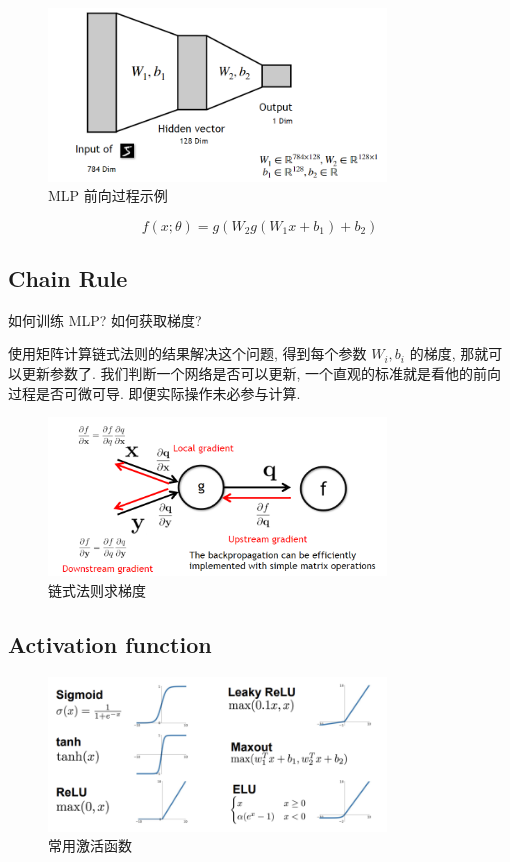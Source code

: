 \begin{figure}[htbp]
    \centering
    \includegraphics[width=0.8\textwidth]{figures/mlp.png}
    \caption{MLP 前向过程示例}
    \label{fig:mlp}
\end{figure}
$$ f(x; \theta) = g(W_2 g(W_1 x + b_1) + b_2) $$


\subsection{Chain Rule}
\begin{problem}
    如何训练 MLP? 如何获取梯度?
\end{problem}
使用矩阵计算链式法则的结果解决这个问题, 得到每个参数 $W_i, b_i$ 的梯度, 那就可以更新参数了. 我们判断一个网络是否可以更新, 一个直观的标准就是看他的前向过程是否可微可导. 即便实际操作未必参与计算. 
\begin{figure}[htbp]
    \centering
    \includegraphics[width=0.8\textwidth]{figures/chainrule.png}
    \caption{链式法则求梯度}
    \label{fig:chainrule}
\end{figure}

\subsection{Activation function}

\begin{figure}[htbp]
    \centering
    \includegraphics[width=0.8\textwidth]{figures/activationfunc.png}
    \caption{常用激活函数}
    \label{fig:chainrule}
\end{figure}

